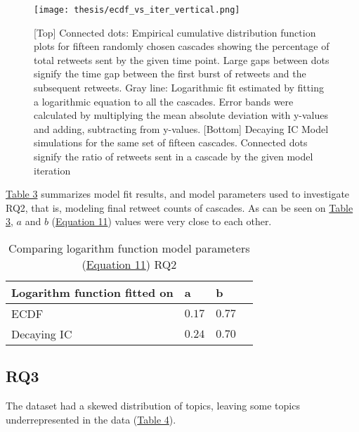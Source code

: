 \documentclass[11pt,a4paper]{article}
\begin{document}
    \begin{figure}[H]
        \hypertarget{fig:ecdf-vs-iter}{}
        \centering
        \texttt{[image: thesis/ecdf\_vs\_iter\_vertical.png]}\\
        \caption{[Top] Connected dots: Empirical cumulative distribution function plots for fifteen randomly chosen cascades showing the percentage of total retweets sent by the given time point. Large gaps between dots signify the time gap between the first burst of retweets and the subsequent retweets. Gray line: Logarithmic fit estimated by fitting a logarithmic equation to all the cascades. Error bands were calculated by multiplying the mean absolute deviation with y-values and  adding, subtracting from y-values. [Bottom] Decaying IC Model simulations for the same set of fifteen cascades. Connected dots signify the ratio of retweets sent in a cascade by the given model iteration} 
        \label{fig:enter-label}
    \end{figure}

    \hyperlink{tab:comp2}{Table 3} summarizes model fit results, and model parameters used to investigate RQ2, that is, modeling final retweet counts of cascades. As can be seen on \hyperlink{tab:comp}{Table 3}, $a$ and $b$ (\hyperlink{eq:log}{Equation 11}) values were very close to each other.

    \begin{table}[H]
        \hypertarget{tab:comp2}{}
      \centering
      \begin{tabular}{|l|l|l|l|}
        \hline
        \textbf{Logarithm function fitted on} & \textbf{a} & \textbf{b} \\
        \hline
        ECDF    & $0.17$ & $0.77$   \\
        Decaying IC & $0.24$ & $0.70$ \\
        \hline
      \end{tabular}
      \caption{Comparing logarithm function model parameters (\hyperlink{eq:log}{Equation 11}) RQ2}
      \label{tab:mytable}
    \end{table}

    \subsection{RQ3}
        The dataset had a skewed distribution of topics, leaving some topics underrepresented in the data (\hyperlink{fig:topic-dist}{Table 4}).
        
\end{document}
